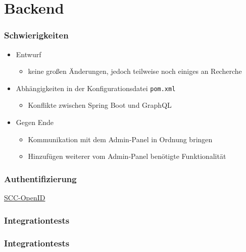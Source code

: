\section{Backend}

\begin{frame}\frametitle{Schwierigkeiten}
\begin{itemize}
	\item Entwurf
	\begin{itemize}
		\item keine großen Änderungen, jedoch teilweise noch einiges an Recherche
	\end{itemize}
	\item Abhängigkeiten in der Konfigurationsdatei \texttt{pom.xml}
	\begin{itemize}
		\item Konflikte zwischen Spring Boot und GraphQL
	\end{itemize}
	\item Gegen Ende
	\begin{itemize}
		\item Kommunikation mit dem Admin-Panel in Ordnung bringen
		\item Hinzufügen weiterer vom Admin-Panel benötigte Funktionalität
	\end{itemize}
\end{itemize}
\end{frame}


    \begin{frame}\frametitle{Authentifizierung}
        \href{https://www.scc.kit.edu/dienste/openid-connect.php}{SCC-OpenID}
    \end{frame}

    \begin{frame}\frametitle{Integrationtests}
    \end{frame}

    \begin{frame}\frametitle{Integrationtests}
    \end{frame}

    \begin{frame}
    \end{frame}

    \begin{frame}

    \end{frame}

